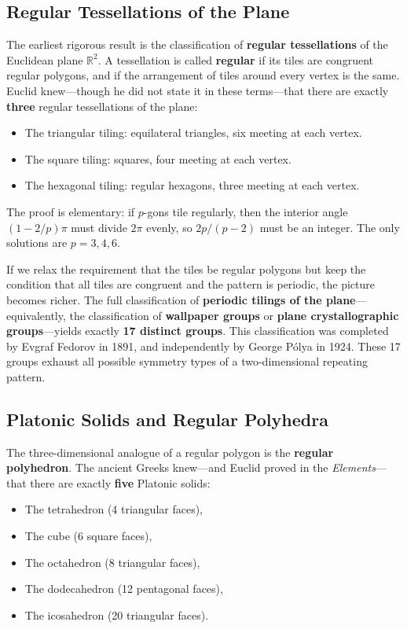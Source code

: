 \subsection{Regular Tessellations of the Plane}

The earliest rigorous result is the classification of \textbf{regular tessellations} of the Euclidean plane $\mathbb{R}^2$. A tessellation is called \textbf{regular} if its tiles are congruent regular polygons, and if the arrangement of tiles around every vertex is the same. Euclid knew---though he did not state it in these terms---that there are exactly \textbf{three} regular tessellations of the plane:

\begin{itemize}
    \item The triangular tiling: equilateral triangles, six meeting at each vertex.
    \item The square tiling: squares, four meeting at each vertex.
    \item The hexagonal tiling: regular hexagons, three meeting at each vertex.
\end{itemize}

The proof is elementary: if $p$-gons tile regularly, then the interior angle $(1-2/p)\pi$ must divide $2\pi$ evenly, so $2p/(p-2)$ must be an integer. The only solutions are $p = 3, 4, 6$.

If we relax the requirement that the tiles be regular polygons but keep the condition that all tiles are congruent and the pattern is periodic, the picture becomes richer. The full classification of \textbf{periodic tilings of the plane}---equivalently, the classification of \textbf{wallpaper groups} or \textbf{plane crystallographic groups}---yields exactly \textbf{17 distinct groups}. This classification was completed by Evgraf Fedorov in 1891, and independently by George Pólya in 1924. These 17 groups exhaust all possible symmetry types of a two-dimensional repeating pattern.

\subsection{Platonic Solids and Regular Polyhedra}

The three-dimensional analogue of a regular polygon is the \textbf{regular polyhedron}. The ancient Greeks knew---and Euclid proved in the \emph{Elements}---that there are exactly \textbf{five} Platonic solids:

\begin{itemize}
    \item The tetrahedron (4 triangular faces),
    \item The cube (6 square faces),
    \item The octahedron (8 triangular faces),
    \item The dodecahedron (12 pentagonal faces),
    \item The icosahedron (20 triangular faces).
\end{itemize}

